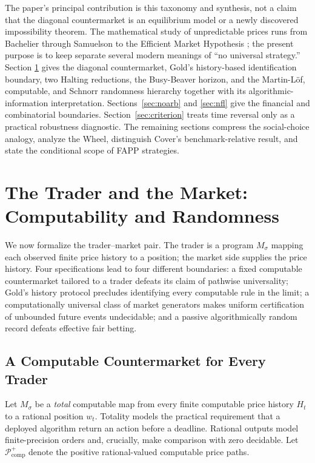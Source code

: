 \documentclass[aps,pra,reprint,superscriptaddress,amsmath,amssymb,floatfix]{revtex4-2}
\theoremstyle{plain}
\theoremstyle{definition}
\theoremstyle{remark}
\begin{document}
The paper's principal contribution is this taxonomy and synthesis, not a claim
that the diagonal countermarket is an equilibrium model or a newly discovered
impossibility theorem. The mathematical study of unpredictable prices
runs from Bachelier through Samuelson to the Efficient Market Hypothesis
\cite{Bachelier1900,Samuelson1965,Fama1970}; the present purpose is to keep
separate several modern meanings of ``no universal strategy.'' Section
\ref{sec:computability} gives the diagonal countermarket, Gold's history-based
identification boundary, two Halting reductions, the Busy-Beaver horizon, and
the Martin-L\"of, computable, and Schnorr randomness hierarchy together with
its algorithmic-information interpretation.
Sections~\ref{sec:noarb} and \ref{sec:nfl} give the financial and combinatorial
boundaries. Section~\ref{sec:criterion} treats time reversal only as a practical
robustness diagnostic. The remaining sections compress the social-choice
analogy, analyze the Wheel, distinguish Cover's benchmark-relative result, and
state the conditional scope of FAPP strategies.

\section{The Trader and the Market: Computability and Randomness}
\label{sec:computability}

We now formalize the trader--market pair. The trader is a program
\(M_\sigma\) mapping each observed finite price history to a position; the
market side supplies the price history. Four specifications lead to four
different boundaries: a fixed computable countermarket tailored to a trader
defeats its claim of pathwise universality; Gold's history protocol precludes
identifying every computable rule in the limit; a computationally universal
class of market generators makes uniform certification of unbounded future
events undecidable; and a passive algorithmically random record defeats
effective fair betting.

\subsection{A Computable Countermarket for Every Trader}

Let \(M_\sigma\) be a \emph{total} computable map from every finite computable
price history \(H_t\) to a rational position \(w_t\). Totality models the
practical requirement that a deployed algorithm return an action before a
deadline. Rational outputs model finite-precision orders and, crucially, make
comparison with zero decidable. Let \(\mathcal P_{\mathrm{comp}}^{+}\) denote
the positive rational-valued computable price paths.
\end{document}
